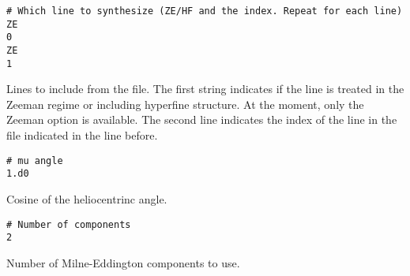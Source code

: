 \documentclass[12pt]{article}
\begin{document}
\begin{verbatim}
# Which line to synthesize (ZE/HF and the index. Repeat for each line)
ZE
0
ZE
1
\end{verbatim}
Lines to include from the file. The first string indicates if the line is
treated in the Zeeman regime or including hyperfine structure. At the moment,
only the Zeeman option is available. The second line indicates the index
of the line in the file indicated in the line before.

\begin{verbatim}
# mu angle
1.d0
\end{verbatim}
Cosine of the heliocentrinc angle.

\begin{verbatim}
# Number of components
2
\end{verbatim}
Number of Milne-Eddington components to use.
\end{document}
